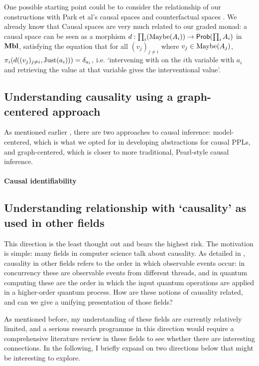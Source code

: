 \documentclass[11pt,a4paper]{article}
\begin{document}
One possible starting point could be to consider the relationship of our constructions with Park et al's causal spaces \cite{park2024measuretheoreticaxiomatisationcausality} and counterfactual spaces \cite{park2026counterfactualspaces}. We already know that Causal spaces are very much related to our graded monad: a causal space can be seen as a morphism $d: \prod_i (\mathrm{Maybe}({A_i})) \to \mathsf{Prob}(\prod_i A_i)$ in $\mathbf{Mbl}$, satisfying the equation that for all $(v_j)_{j \neq i}$ where $v_j \in \mathrm{Maybe}({A_j})$, $\pi_i(d((v_j)_{j \neq i},\mathrm{Just}({a_i}))) = \delta_{a_i}$, i.e. `intervening with on the $i$th variable with $a_i$ and retrieving the value at that variable gives the interventional value'. 

\subsection{Understanding causality using a graph-centered approach}

As mentioned earlier , there are two approaches to causal inference: model-centered, which is what we opted for in developing abstractions for causal PPLs, and graph-centered, which is closer to more traditional, Pearl-style causal inference. 

\paragraph{Causal identifiability}

\subsection{Understanding relationship with `causality' as used in other fields}

This direction is the least thought out and bears the highest risk. The motivation is simple: many fields in computer science talk about causality. As detailed in , causality in other fields refers to the order in which observable events occur: in concurrency these are observable events from different threads, and in quantum computing these are the order in which the input quantum operations are applied in a higher-order quantum process. How are these notions of causality related, and can we give a unifying presentation of those fields? 

As mentioned before, my understanding of these fields are currently relatively limited, and a serious research programme in this direction would require a comprehensive literature review in these fields to see whether there are interesting connections. In the following, I briefly expand on two directions below that might be interesting to explore.
\end{document}

